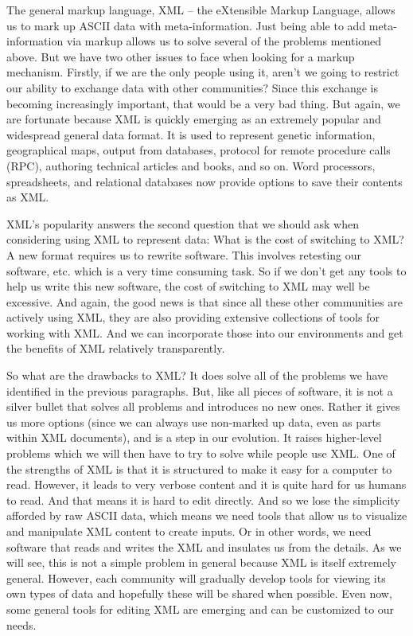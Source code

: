 The general markup language, XML -- the eXtensible Markup Language,
allows us to mark up ASCII data with meta-information. 
Just being able to add meta-information via markup allows us to solve
several of the problems mentioned above. 
But we have two other issues to face when looking for a
markup mechanism. Firstly, if we are the only people using it, aren't
we going to restrict our ability to exchange data with other
communities? Since this exchange is becoming increasingly important,
that would be a very bad thing. But again, we are fortunate because
XML is quickly emerging as an extremely popular and widespread general
data format. It is used to represent genetic information, geographical
maps, output from databases, protocol for remote procedure calls
(RPC), authoring technical articles and books, and so on.  Word
processors, spreadsheets, and relational databases now provide options 
to save their contents as XML.

XML's popularity answers the second question that we should ask when
considering using XML to represent data: What is the cost of switching
to XML?  A new format requires us to
rewrite software. This involves retesting our software, etc. which is
a very time consuming task. So if we don't get any tools to help us
write this new software, the cost of switching to XML may well be
excessive. And again, the good news is that since all these other
communities are actively using XML, they are also providing extensive
collections of tools for working with XML. And we can incorporate
those into our environments and get the benefits of XML relatively
transparently.

So what are the drawbacks to XML?
It does solve all of the problems we have identified in the
previous paragraphs. But, like all pieces of software, it is not a
silver bullet that solves all problems and introduces no new ones.
Rather it gives us more options (since we can always use non-marked up
data, even as parts within XML documents), and is a step in our
evolution.  It raises higher-level problems which we will then have to
try to solve while people use XML.  One of the strengths of XML is
that it is structured to make it easy for a computer to read.
However, it leads to very verbose content and it is quite hard for us
humans to read. And that means it is hard to edit
directly. And so we lose the simplicity afforded by raw ASCII data,
which means we need tools that allow us to visualize and manipulate XML content
to create inputs. Or in other words, we need software that reads and
writes the XML and insulates us from the details.  As we will see,
this is not a simple problem in general because XML is itself
extremely general. However, each community will gradually develop
tools for viewing its own types of data and hopefully these will be
shared when possible. Even now, some general tools for editing XML are
emerging and can be customized to our needs.


